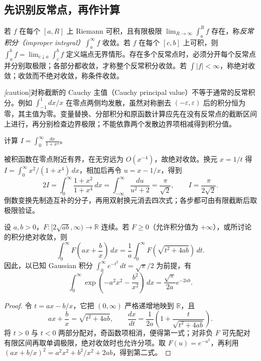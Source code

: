 \subsection{先识别反常点，再作计算}
\begin{definition}
若 $f$ 在每个 $[a,R]$ 上 Riemann 可积，且有限极限 $\lim_{R\to\infty}\int_a^Rf$ 存在，称\emph{反常积分（improper integral）}$\int_a^\infty f$ 收敛。若 $f$ 在每个 $[c,b]$ 上可积，则 $\int_a^bf=\lim_{c\downarrow a}\int_c^bf$ 定义端点无界情形。存在多个反常点时，必须分开每个反常点并分别取极限；各部分都收敛，才称整个反常积分收敛。若 $\int|f|<\infty$，称绝对收敛；收敛而不绝对收敛，称条件收敛。
\end{definition}
\emph[caution]{对称截断的 Cauchy 主值（Cauchy principal value）不等于通常的反常积分}。例如 $\int_{-1}^1 dx/x$ 在零点两侧均发散，虽然对称删去 $(-\varepsilon,\varepsilon)$ 后的积分恒为零，其主值为零。变量替换、分部积分和原函数计算应先在没有反常点的截断区间上进行，再分别检查边界极限；不能依靠两个发散边界项相减得到积分值。

\begin{example}
计算 $\displaystyle I=\int_0^\infty\frac{dx}{1+x^4}$。
\end{example}
\begin{solve}
被积函数在零点附近有界，在无穷远为 $O(x^{-4})$，故绝对收敛。换元 $x=1/t$ 得 $I=\int_0^\infty x^2/(1+x^4)\,dx$，相加后再令 $u=x-1/x$，得到
\[
 2I=\int_0^\infty\frac{1+x^2}{1+x^4}\,dx
 =\int_{-\infty}^\infty\frac{du}{u^2+2}=\frac\pi{\sqrt2},
 \qquad I=\frac\pi{2\sqrt2}.
\]
倒数变换先制造互补的分子，再用双射换元消去四次式；各步都可由有限截断后取极限验证。
\end{solve}

\begin{proposition}
设 $a,b>0$，$F:[2\sqrt{ab},\infty)\to\mathbb R$ 连续。若 $F\ge0$（允许积分值为 $+\infty$），或所讨论的积分绝对收敛，则
\[
 \int_0^\infty F\left(ax+\frac bx\right)\,dx
 =\frac1a\int_0^\infty F\left(\sqrt{t^2+4ab}\right)\,dt.
\]
因此，以已知 Gaussian 积分 $\int_0^\infty e^{-t^2}\,dt=\sqrt\pi/2$ 为前提，有
\[
 \int_0^\infty\exp\left(-a^2x^2-\frac{b^2}{x^2}\right)\,dx
 =\frac{\sqrt\pi}{2a}e^{-2ab}.
\]
\end{proposition}
\begin{proof}
令 $t=ax-b/x$，它把 $(0,\infty)$ 严格递增地映到 $\mathbb R$，且
\[
 ax+\frac bx=\sqrt{t^2+4ab},\qquad
 \frac{dx}{dt}=\frac1{2a}\left(1+\frac t{\sqrt{t^2+4ab}}\right).
\]
将 $t>0$ 与 $t<0$ 两部分配对，奇函数项相消，便得第一式；对非负 $F$ 可先配对有限区间再取单调极限，绝对收敛时也允许分项。取 $F(u)=e^{-u^2}$，再利用 $(ax+b/x)^2=a^2x^2+b^2/x^2+2ab$，得到第二式。
\end{proof}

